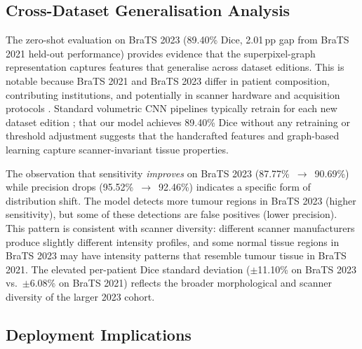 \documentclass{article}
\begin{document}
\subsection{Cross-Dataset Generalisation Analysis}

The zero-shot evaluation on BraTS 2023 (89.40\% Dice, 2.01\,pp gap from BraTS
2021 held-out performance) provides evidence that the superpixel-graph
representation captures features that generalise across dataset editions. This
is notable because BraTS 2021 and BraTS 2023 differ in patient composition,
contributing institutions, and potentially in scanner hardware and acquisition
protocols \cite{menze2015multimodal, bakas2021brats}. Standard volumetric CNN
pipelines typically retrain for each new dataset edition
\cite{isensee2021nnunet}; that our model achieves 89.40\% Dice without any
retraining or threshold adjustment suggests that the handcrafted features and
graph-based learning capture scanner-invariant tissue properties.

The observation that sensitivity \textit{improves} on BraTS 2023
(87.77\%~$\rightarrow$~90.69\%) while precision drops
(95.52\%~$\rightarrow$~92.46\%) indicates a specific form of distribution
shift. The model detects more tumour regions in BraTS 2023 (higher
sensitivity), but some of these detections are false positives (lower
precision). This pattern is consistent with scanner diversity: different
scanner manufacturers produce slightly different intensity profiles, and some
normal tissue regions in BraTS 2023 may have intensity patterns that resemble
tumour tissue in BraTS 2021. The elevated per-patient Dice standard deviation
($\pm$11.10\% on BraTS 2023 vs.\ $\pm$6.08\% on BraTS 2021) reflects the
broader morphological and scanner diversity of the larger 2023 cohort.

\subsection{Deployment Implications}
\end{document}
